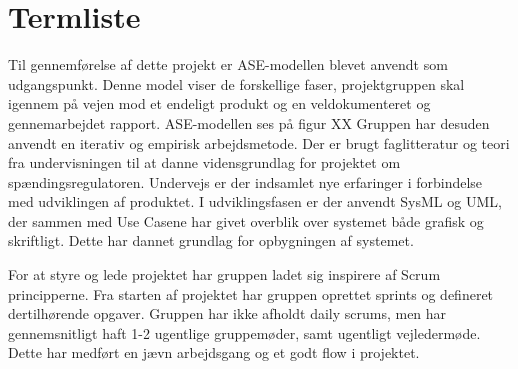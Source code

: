 \chapter{Termliste}


Til gennemførelse af dette projekt er ASE-modellen blevet anvendt som udgangspunkt. Denne model viser de forskellige faser, projektgruppen skal igennem på vejen mod et endeligt produkt og en veldokumenteret og gennemarbejdet rapport. ASE-modellen ses på figur XX Gruppen har desuden anvendt en iterativ og empirisk arbejdsmetode. Der er brugt faglitteratur og teori fra undervisningen til at danne vidensgrundlag for projektet om spændingsregulatoren. Undervejs er der indsamlet nye erfaringer i forbindelse med udviklingen af produktet. 
I udviklingsfasen er der anvendt SysML og UML, der sammen med Use Casene har givet overblik over systemet både grafisk og skriftligt. Dette har dannet grundlag for opbygningen af systemet. 


For at styre og lede projektet har gruppen ladet sig inspirere af Scrum principperne. Fra starten af projektet har gruppen oprettet sprints og defineret dertilhørende opgaver. Gruppen har ikke afholdt daily scrums, men har gennemsnitligt haft 1-2 ugentlige gruppemøder, samt ugentligt vejledermøde. Dette har medført en jævn arbejdsgang og et godt flow i projektet. 
